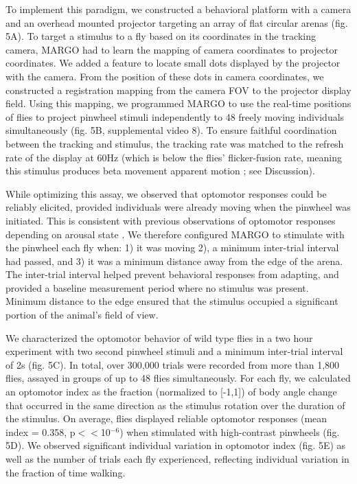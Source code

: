 \documentclass[12pt,letterpaper]{article}
\begin{document}
To implement this paradigm, we constructed a behavioral platform with a camera and an overhead mounted projector targeting an array of flat circular arenas (fig. 5A). To target a stimulus to a fly based on its coordinates in the tracking camera, MARGO had to learn the mapping of camera coordinates to projector coordinates. We added a feature to locate small dots displayed by the projector with the camera. From the position of these dots in camera coordinates, we constructed a registration mapping from the camera FOV to the projector display field. Using this mapping, we programmed MARGO to use the real-time positions of flies to project pinwheel stimuli independently to 48 freely moving individuals simultaneously (fig. 5B, supplemental video 8). To ensure faithful coordination between the tracking and stimulus, the tracking rate was matched to the refresh rate of the display at 60Hz (which is below the flies' flicker-fusion rate, meaning this stimulus produces beta movement apparent motion \cite{haag_arenz_serbe_gabbiani_borst_2016}; see Discussion). 

While optimizing this assay, we observed that optomotor responses could be reliably elicited, provided individuals were already moving when the pinwheel was initiated. This is consistent with previous observations of optomotor responses depending on arousal state \cite{Zhu_Peripheral_2009,Kim_Fly_2016}. We therefore configured MARGO to stimulate with the pinwheel each fly when: 1) it was moving 2), a minimum inter-trial interval had passed, and 3) it was a minimum distance away from the edge of the arena. The inter-trial interval helped prevent behavioral responses from adapting, and provided a baseline measurement period where no stimulus was present. Minimum distance to the edge ensured that the stimulus occupied a significant portion of the animal's field of view. 

We characterized the optomotor behavior of wild type flies in a two hour experiment with two second pinwheel stimuli and a minimum inter-trial interval of 2s (fig. 5C). In total, over 300,000 trials were recorded from more than 1,800 flies, assayed in groups of up to 48 flies simultaneously. For each fly, we calculated an optomotor index \cite{Seelig_Two_2010} as the fraction (normalized to [-1,1]) of body angle change that occurred in the same direction as the stimulus rotation over the duration of the stimulus. On average, flies displayed reliable optomotor responses (mean index = 0.358, p$<<$10$^{-6}$) when stimulated with high-contrast pinwheels (fig. 5D). We observed significant individual variation in optomotor index (fig. 5E) as well as the number of trials each fly experienced, reflecting individual variation in the fraction of time walking. 
\end{document}
